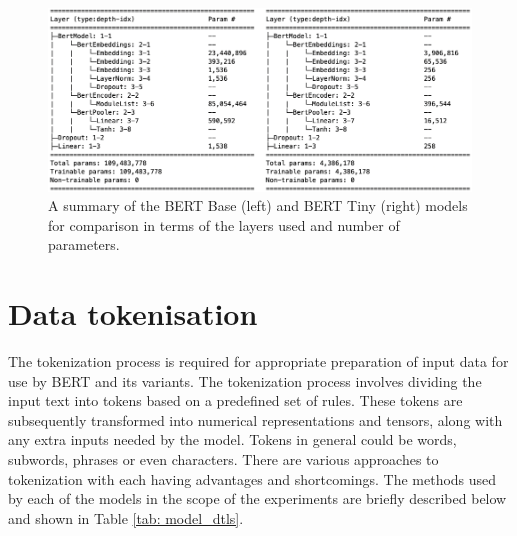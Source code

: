 \begin{figure}[htb]
    \centering
    \includegraphics[width=15cm]{figures/model-summary.png}
    \vspace*{-3mm}
    \caption{A summary of the BERT Base (left) and BERT Tiny (right) models for comparison in terms of the layers used and number of parameters.}
    \label{fig: model_summary}
\end{figure}

\section{Data tokenisation}
The tokenization process is required for appropriate preparation of input data for use by BERT and its variants. The tokenization process involves dividing the input text into tokens based on a predefined set of rules. These tokens are subsequently transformed into numerical representations and tensors, along with any extra inputs needed by the model. Tokens in general could be words, subwords, phrases or even characters. There are various approaches to tokenization with each having advantages and shortcomings. The methods used by each of the models in the scope of the experiments are briefly described below and shown in Table \ref{tab: model_dtls}.


